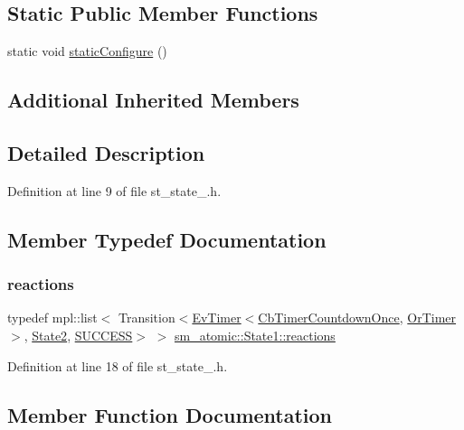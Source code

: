 \subsection*{Static Public Member Functions}
\begin{DoxyCompactItemize}
\item 
static void \hyperlink{structsm__atomic_1_1State1_a299adfad0ff1e2c592c319e1fa5de114}{static\+Configure} ()
\end{DoxyCompactItemize}
\subsection*{Additional Inherited Members}


\subsection{Detailed Description}


Definition at line 9 of file st\+\_\+state\+\_.\+h.



\subsection{Member Typedef Documentation}
\mbox{\label{structsm__atomic_1_1State1_ab05a524c2d0d99c2ca7c4174d49de73c}} 
\subsubsection{\texorpdfstring{reactions}{reactions}}
{\footnotesize\ttfamily typedef mpl\+::list$<$ Transition$<$\hyperlink{structcl__ros__timer_1_1EvTimer}{Ev\+Timer}$<$\hyperlink{classcl__ros__timer_1_1CbTimerCountdownOnce}{Cb\+Timer\+Countdown\+Once}, \hyperlink{classsm__atomic_1_1OrTimer}{Or\+Timer}$>$, \hyperlink{structsm__atomic_1_1State2}{State2}, \hyperlink{structsmacc_1_1default__transition__tags_1_1SUCCESS}{S\+U\+C\+C\+E\+SS}$>$ $>$ \hyperlink{structsm__atomic_1_1State1_ab05a524c2d0d99c2ca7c4174d49de73c}{sm\+\_\+atomic\+::\+State1\+::reactions}}



Definition at line 18 of file st\+\_\+state\+\_.\+h.



\subsection{Member Function Documentation}
\mbox{\label{structsm__atomic_1_1State1_ad6ed37a83a5afaae623428d4342c1cd3}} 
